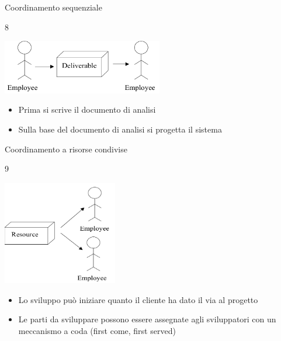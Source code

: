 \documentclass{beamer}
\begin{document}
\begin{frame}{\centerline{Coordinamento sequenziale}}
8

\begin{center}
\includegraphics[width=70mm]{A2022.IDSEPC.ProcessoDiProduzione/img-img11.png}
\end{center}

\begin{itemize}
\item  Prima si scrive il documento di analisi


\item  Sulla base del documento di analisi si progetta il sistema


 
\end{itemize}

\end{frame}

\begin{frame}{\centerline{Coordinamento a risorse condivise}}
9
\begin{center}
\includegraphics[width=50mm]{A2022.IDSEPC.ProcessoDiProduzione/img-img12.png}
\end{center}

\begin{itemize}
\item  Lo sviluppo pu\`{o} iniziare quanto il cliente ha dato il via al progetto

\item Le parti da sviluppare possono essere assegnate agli sviluppatori con un meccanismo a coda (first come, first served)


\end{itemize}


\end{frame}
\end{document}
